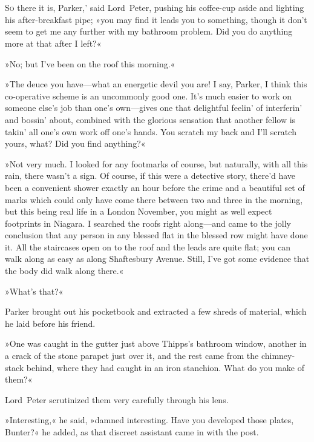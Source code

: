 \chapter[Chapter \thechapter]{}
\lettrine[lines=4,ante=‘—]{S}{o} there it is, Parker,' said Lord~Peter, pushing his coffee-cup aside and lighting his after-breakfast pipe; »you may find it leads you to something, though it don't seem to get me any further with my bathroom problem. Did you do anything more at that after I left?«

»No; but I've been on the roof this morning.«

»The deuce you have—what an energetic devil you are! I say, Parker, I think this co-operative scheme is an uncommonly good one. It's much easier to work on someone else's job than one's own—gives one that delightful feelin' of interferin' and bossin' about, combined with the glorious sensation that another fellow is takin' all one's own work off one's hands. You scratch my back and I'll scratch yours, what? Did you find anything?«

»Not very much. I looked for any footmarks of course, but naturally, with all this rain, there wasn't a sign. Of course, if this were a detective story, there'd have been a convenient shower exactly an hour before the crime and a beautiful set of marks which could only have come there between two and three in the morning, but this being real life in a London November, you might as well expect footprints in Niagara. I searched the roofs right along—and came to the jolly conclusion that any person in any blessed flat in the blessed row might have done it. All the staircases open on to the roof and the leads are quite flat; you can walk along as easy as along Shaftesbury Avenue. Still, I've got some evidence that the body did walk along there.«

»What's that?«

Parker brought out his pocketbook and extracted a few shreds of material, which he laid before his friend.

»One was caught in the gutter just above Thipps's bathroom window, another in a crack of the stone parapet just over it, and the rest came from the chimney-stack behind, where they had caught in an iron stanchion. What do you make of them?«

Lord~Peter scrutinized them very carefully through his lens.

»Interesting,« he said, »damned interesting. Have you developed those plates, Bunter?« he added, as that discreet assistant came in with the post.

